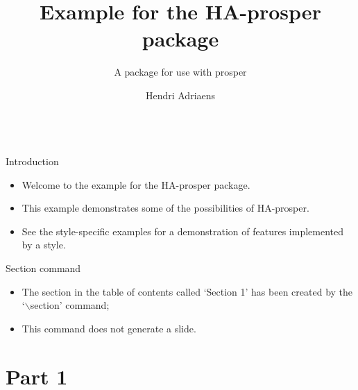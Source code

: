 \documentclass[pdf]{prosper}
\title{Example for the HA-prosper package}
\subtitle{A package for use with prosper}
\author{Hendri Adriaens\\
\institution{CentER}\\
\institution{\href{http://center.uvt.nl/phd_stud/adriaens}{http://center.uvt.nl/phd\string_stud/adriaens}}}
\begin{document}
\maketitle


\begin{slide}{Introduction}
\begin{itemize}
\item Welcome to the example for the HA-prosper package. \item
This example demonstrates some of the possibilities of HA-prosper.
\item See the style-specific examples for a demonstration of
features implemented by a style.
\end{itemize}
\end{slide}




\begin{slide}{Section command}
\begin{itemize}
\item The section in the table of contents called `Section 1' has been
created by the `$\backslash$section' command;
\item This command does not generate a slide.
\end{itemize}
\end{slide}


\part[toc=Part 1!!!,template=wideslide,trans=Dissolve]{Part 1}
\end{document}
